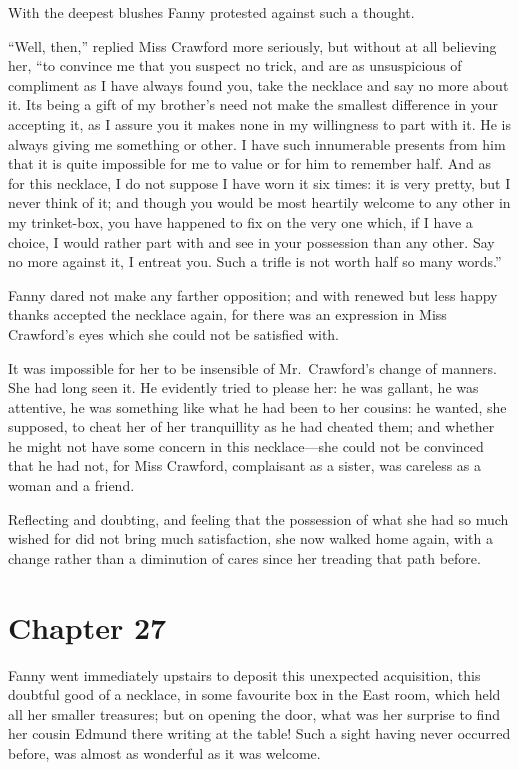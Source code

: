 With the deepest blushes Fanny protested against such
a thought.

``Well, then,'' replied Miss Crawford more seriously,
but without at all believing her, ``to convince me that you
suspect no trick, and are as unsuspicious of compliment
as I have always found you, take the necklace and say
no more about it.  Its being a gift of my brother's need
not make the smallest difference in your accepting it,
as I assure you it makes none in my willingness to part
with it.  He is always giving me something or other.
I have such innumerable presents from him that it is quite
impossible for me to value or for him to remember half.
And as for this necklace, I do not suppose I have worn it
six times:  it is very pretty, but I never think of it;
and though you would be most heartily welcome to any
other in my trinket-box, you have happened to fix on
the very one which, if I have a choice, I would rather
part with and see in your possession than any other.
Say no more against it, I entreat you.  Such a trifle is
not worth half so many words.''

Fanny dared not make any farther opposition; and with
renewed but less happy thanks accepted the necklace again,
for there was an expression in Miss Crawford's eyes
which she could not be satisfied with.

It was impossible for her to be insensible of Mr.\ Crawford's
change of manners.  She had long seen it.  He evidently
tried to please her:  he was gallant, he was attentive,
he was something like what he had been to her cousins:
he wanted, she supposed, to cheat her of her tranquillity
as he had cheated them; and whether he might not have some
concern in this necklace---she could not be convinced that
he had not, for Miss Crawford, complaisant as a sister,
was careless as a woman and a friend.

Reflecting and doubting, and feeling that the possession
of what she had so much wished for did not bring much
satisfaction, she now walked home again, with a change rather
than a diminution of cares since her treading that path before.



\chapter{Chapter 27}

 Fanny went immediately upstairs to
deposit this unexpected acquisition, this doubtful good
of a necklace, in some favourite box in the East room,
which held all her smaller treasures; but on opening
the door, what was her surprise to find her cousin Edmund
there writing at the table!  Such a sight having never
occurred before, was almost as wonderful as it was welcome.


